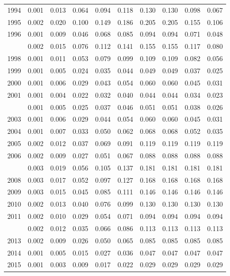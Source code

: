 \documentclass[
]{article}
\begin{document}
\begin{longtable}[t]{lrrrrrrrrr}
1994 & 0.001 & 0.013 & 0.064 & 0.094 & 0.118 & 0.130 & 0.130 & 0.098 & 0.067\\
1995 & 0.002 & 0.020 & 0.100 & 0.149 & 0.186 & 0.205 & 0.205 & 0.155 & 0.106\\
1996 & 0.001 & 0.009 & 0.046 & 0.068 & 0.085 & 0.094 & 0.094 & 0.071 & 0.048\\
\addlinespace
1997 & 0.002 & 0.015 & 0.076 & 0.112 & 0.141 & 0.155 & 0.155 & 0.117 & 0.080\\
1998 & 0.001 & 0.011 & 0.053 & 0.079 & 0.099 & 0.109 & 0.109 & 0.082 & 0.056\\
1999 & 0.001 & 0.005 & 0.024 & 0.035 & 0.044 & 0.049 & 0.049 & 0.037 & 0.025\\
2000 & 0.001 & 0.006 & 0.029 & 0.043 & 0.054 & 0.060 & 0.060 & 0.045 & 0.031\\
2001 & 0.001 & 0.004 & 0.022 & 0.032 & 0.040 & 0.044 & 0.044 & 0.034 & 0.023\\
\addlinespace
2002 & 0.001 & 0.005 & 0.025 & 0.037 & 0.046 & 0.051 & 0.051 & 0.038 & 0.026\\
2003 & 0.001 & 0.006 & 0.029 & 0.044 & 0.054 & 0.060 & 0.060 & 0.045 & 0.031\\
2004 & 0.001 & 0.007 & 0.033 & 0.050 & 0.062 & 0.068 & 0.068 & 0.052 & 0.035\\
2005 & 0.002 & 0.012 & 0.037 & 0.069 & 0.091 & 0.119 & 0.119 & 0.119 & 0.119\\
2006 & 0.002 & 0.009 & 0.027 & 0.051 & 0.067 & 0.088 & 0.088 & 0.088 & 0.088\\
\addlinespace
2007 & 0.003 & 0.019 & 0.056 & 0.105 & 0.137 & 0.181 & 0.181 & 0.181 & 0.181\\
2008 & 0.003 & 0.017 & 0.052 & 0.097 & 0.127 & 0.168 & 0.168 & 0.168 & 0.168\\
2009 & 0.003 & 0.015 & 0.045 & 0.085 & 0.111 & 0.146 & 0.146 & 0.146 & 0.146\\
2010 & 0.002 & 0.013 & 0.040 & 0.076 & 0.099 & 0.130 & 0.130 & 0.130 & 0.130\\
2011 & 0.002 & 0.010 & 0.029 & 0.054 & 0.071 & 0.094 & 0.094 & 0.094 & 0.094\\
\addlinespace
2012 & 0.002 & 0.012 & 0.035 & 0.066 & 0.086 & 0.113 & 0.113 & 0.113 & 0.113\\
2013 & 0.002 & 0.009 & 0.026 & 0.050 & 0.065 & 0.085 & 0.085 & 0.085 & 0.085\\
2014 & 0.001 & 0.005 & 0.015 & 0.027 & 0.036 & 0.047 & 0.047 & 0.047 & 0.047\\
2015 & 0.001 & 0.003 & 0.009 & 0.017 & 0.022 & 0.029 & 0.029 & 0.029 & 0.029\\

\end{longtable}
\end{document}
